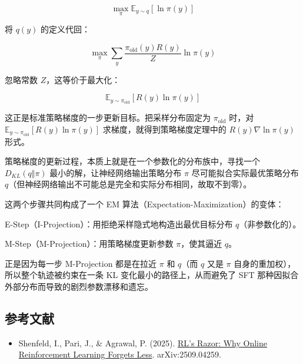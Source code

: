 \[
\max_\pi \mathbb{E}_{y\sim q}[\ln \pi(y)]
\]

将 \(q(y)\) 的定义代回：

\[
\max_\pi \sum_y \frac{\pi_{\mathrm{old}}(y)R(y)}{Z}\ln\pi(y)
\]

忽略常数 \(Z\)，这等价于最大化：

\[
\mathbb{E}_{y\sim \pi_{\mathrm{old}}}[R(y)\ln\pi(y)]
\]

这正是标准策略梯度的一步更新目标。把采样分布固定为 \(\pi_{\mathrm{old}}\) 时，对 \(\mathbb{E}_{y\sim\pi_{\mathrm{old}}}[R(y)\ln\pi(y)]\) 求梯度，就得到策略梯度定理中的 \(R(y)\nabla\ln\pi(y)\) 形式。

策略梯度的更新过程，本质上就是在一个参数化的分布族中，寻找一个 \(D_{KL}(q\Vert \pi)\) 最小的解，让神经网络输出策略分布 \(\pi\) 尽可能拟合实际最优策略分布 \(q\)（但神经网络输出不可能总是完全和实际分布相同，故取不到零）。

这两个步骤共同构成了一个 EM 算法（Expectation-Maximization）的变体：

E-Step（I-Projection）：用拒绝采样隐式地构造出最优目标分布 \(q\)（非参数化的）。

M-Step（M-Projection）：用策略梯度更新参数 \(\pi\)，使其逼近 \(q\)。

正是因为每一步 M-Projection 都是在拉近 \(\pi\) 和 \(q\)（而 \(q\) 又是 \(\pi\) 自身的重加权），所以整个轨迹被约束在一条 KL 变化最小的路径上，从而避免了 SFT 那种因拟合外部分布而导致的剧烈参数漂移和遗忘。

\hypertarget{ux53c2ux8003ux6587ux732e-87}{%
\subsection{参考文献}\label{ux53c2ux8003ux6587ux732e-87}}

\vspace{0.25em}
\begin{itemize}
\tightlist
\item
  Shenfeld, I., Pari, J., \& Agrawal, P. (2025). \href{https://arxiv.org/abs/2509.04259}{RL's Razor: Why Online Reinforcement Learning Forgets Less}. arXiv:2509.04259.
\end{itemize}

\clearpage
